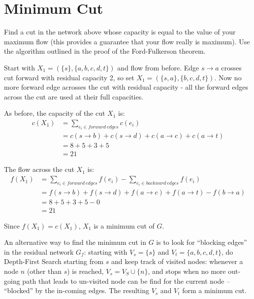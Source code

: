 \documentclass{article}
\begin{document}
\section{Minimum Cut}
Find a cut in the network above whose capacity is equal to the value
of your maximum flow (this provides a guarantee that your flow really
is maximum). Use the algorithm outlined in the proof of the
Ford-Fulkerson theorem.

Start with $X_1 = (\{s\}, \{a,b,c,d,t\})$ and flow from before.
Edge $s \rightarrow a$ crosses cut forward with residual capacity 2, so set
$X_1 = (\{s,a\}, \{b,c,d,t\})$. Now no more forward edge acrosses the cut 
with residual capacity - all the forward edges across the cut are used at
their full capacities.

As before, the capacity of the cut $X_1$ is:
\begin{equation}
	\begin{split}
		c(X_1) &= \sum_{e_i \in forward~edges} c(e_i)\\
		&=c(s \rightarrow b) + c(s \rightarrow d) + 
		c(a\rightarrow c) + c(a \rightarrow t)\\
		&= 8 + 5 + 3 + 5 \\
		&= 21
	\end{split}
\end{equation}

The flow across the cut $X_1$ is:
\begin{equation}
	\begin{split}
		f(X_1) &= \sum_{e_i \in forward~edges} f(e_i)
		- \sum_{e_i \in backward~edges} f(e_i)\\
		&= f(s \rightarrow b) + f(s \rightarrow d) + 
		f(a \rightarrow c) + f(a\rightarrow t) - f(b \rightarrow a)\\
		&=8 + 5 + 3 + 5 -0\\
		&= 21
	\end{split}
\end{equation}

Since $f(X_1) = c(X_1)$, $X_1$ is a minimum cut of $G$.

An alternative way to find the minimum cut in $G$ is to look for ``blocking edges'' in
the residual network $G_f$: starting with 
$V_s = \{s\}$ and $V_t = \{a, b, c, d, t\}$,
do Depth-First Search starting from $s$ and keep track of visited nodes: 
whenever a node $n$ (other than $s$) is reached, $V_s = V_S \cup \{n\}$,
and stops when no more out-going path that leads to un-visited node 
can be find for the current node -- ``blocked'' by the in-coming edges.
The resulting $V_s$ and $V_t$ form a minimum cut.
\end{document}
